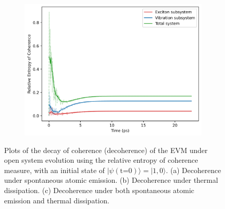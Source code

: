 \documentclass[11pt]{article}
\begin{document}
\begin{figure}[H]
    \vspace{0.5cm}
    
    \begin{subfigure}{0.45\textwidth}
        \centering
        \includegraphics[width=\linewidth]{Research Project/Code/results/ExVib/Open/Coherence/coh_both_e0.png}
        \caption{}
        \label{fig:EVM_OQS_Coh_both}
    \end{subfigure}
    \hfill

    \caption{Plots of the decay of coherence (decoherence) of the EVM under open system evolution using the relative entropy of coherence measure, with an initial state of $|\psi (\text{t=0})\rangle =|1, 0\rangle$. (a) Decoherence under spontaneous atomic emission. (b) Decoherence under thermal dissipation. (c) Decoherence under both spontaneous atomic emission and thermal dissipation.}
    \label{fig:EVM_OQS_Coh}
\end{figure}

\end{document}
